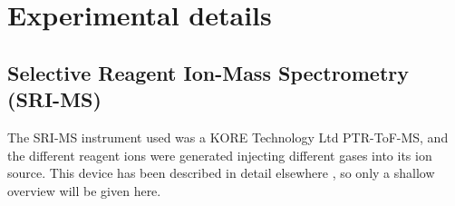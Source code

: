 




\section{Experimental details}

\subsection{Selective Reagent Ion-Mass Spectrometry (SRI-MS)}
The SRI-MS instrument used was a KORE Technology Ltd PTR-ToF-MS, and 
the different reagent ions were generated injecting different gases into its ion source.
This device has been described in detail %
elsewhere \cite{RF_TNT,ellis2013proton}, so only a shallow overview will be given here.

